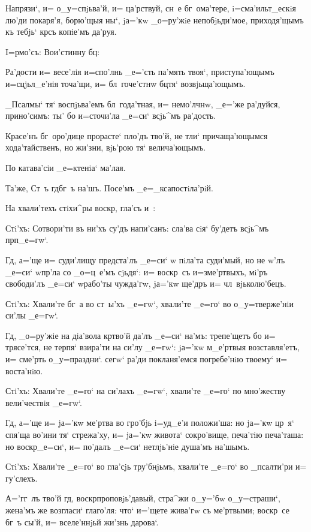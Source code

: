 Напрязи`, и= о_у=спjьва'й, и= ца'рствуй, сн~е 
бг~ома'тере, i=сма'ильт_ескiя лю'ди покаря'я, борю'щыя 
ны`, jа='кw _о=ру'жiе непобjьди'мое, приходя'щымъ къ 
тебjь` кр съ копiе'мъ да'руя.

 I=рмо'съ: Вои'стинну бц:

Ра'дости и= весе'лiя и=спо'лнь _е='сть па'мять твоя`, 
приступа'ющымъ и=сцjьл_е'нiя точа'щи, и= бл~гоче'стнw 
бц тя` возвjьща'ющымъ.

_Псалмы` тя` воспjьва'емъ бл~года'тная, и= немо'лчнw, 
_е='же ра'дуйся, прино'симъ: ты' бо и=сточи'ла _е=си` 
всjь^мъ ра'дость.

Красе'нъ бг~оро'дице прорасте` пло'дъ тво'й, не тли` 
причаща'ющымся хода'тайственъ, но жи'зни, вjь'рою тя` 
велича'ющымъ.

По катава'сiи _е=ктенiа` ма'лая.

Та'же, Ст~ъ гд бг~ъ на'шъ. Посе'мъ 
_е=_ксапостiла'рiй.

На хвали'техъ стiхи^ры воскр, гла'съ и~:

Стi'хъ: Сотвори'ти въ ни'хъ су'дъ напи'санъ: сла'ва 
сiя` бу'детъ всjь^мъ прп _е=гw`.

Гд, а='ще и= суди'лищу предста'лъ _е=си` w\т 
пiла'та суди'мый, но не w'лъ _е=си` w\т пр'ла 
со _о=ц~е'мъ сjьдя`: и= воскр~съ и=з\ъ ме'ртвыхъ, мi'ръ 
свободи'лъ _е=си` w\т рабо'ты чужда'гw, jа='кw ще'дръ и= 
чл~вjьколю'бецъ.

Стi'хъ: Хвали'те бг~а во ст~ы'хъ _е=гw`, хвали'те 
_е=го` во о_у=тверже'нiи си'лы _е=гw`.

Гд, _о=ру'жiе на дiа'вола кр тво'й да'лъ _е=си` 
на'мъ: трепе'щетъ бо и= трясе'тся, не терпя` взира'ти на 
си'лу _е=гw`: jа='кw м_е'ртвыя возставля'етъ, и= сме'рть 
о_у=праздни`. сегw` ра'ди покланя'емся погребе'нiю 
твоему` и= воста'нiю.

Стi'хъ: Хвали'те _е=го` на си'лахъ _е=гw`, хвали'те 
_е=го` по мно'жеству вели'чествiя _е=гw`.

Гд, а='ще и= jа='кw ме'ртва во гро'бjь i=уд_е'и 
положи'ша: но jа='кw цр~я` спя'ща во'ини тя` стрежа'ху, 
и= jа='кw живота` сокро'вище, печа'тiю печа'таша: но 
воскр _е=си`, и= по'далъ _е=си` нетлjь'нiе душа'мъ 
на'шымъ.

Стi'хъ: Хвали'те _е=го` во гла'сjь тру'бнjьмъ, 
хвали'те _е=го` во _псалти'ри и= гу'слехъ.

А='гг~лъ тво'й гд, воскр проповjь'давый, 
стра^жи о_у='бw о_у=страши`, жена'мъ же возгласи` 
глаго'ля: что` и='щете жива'гw съ ме'ртвыми; воскр~се 
бг~ъ сы'й, и= вселе'ннjьй жи'знь дарова`.

